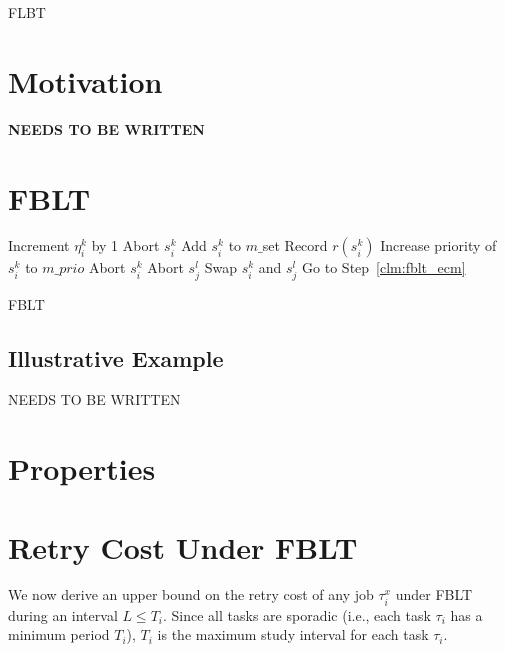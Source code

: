 \documentclass[12pt,english]{report}
\begin{document}
\thispagestyle{empty}

{\Large 
FLBT
}

\section{Motivation}
\textbf{NEEDS TO BE WRITTEN}

\section{FBLT}

\begin{algorithm}[h]
\footnotesize{
\LinesNumbered
{}
{
{
Increment $\eta_i^k$ by 1\;
Abort $s_i^k$\;
}
{
{
Add $s_i^k$ to $m\_$set\;
Record $r(s_i^k)$\;
Increase priority of $s_i^k$ to $m\_prio$\;
}
{
Abort $s_i^k$\;
}
{
Abort $s_j^l$\;
}
}
}
{
Swap $s_i^k$ and $s_j^l$\;
Go to Step~\ref{clm:fblt_ecm}
}
}
\caption{FBLT}\label{fblt-algorithm}
\end{algorithm}

\subsection{Illustrative Example}
NEEDS TO BE WRITTEN

\section{Properties}


\section{Retry Cost Under FBLT}

We now derive an upper bound on the retry cost of any job $\tau_{i}^{x}$
under FBLT during an interval $L\le T_{i}$. Since all tasks are sporadic
(i.e., each task $\tau_{i}$ has a minimum period $T_{i}$), $T_{i}$
is the maximum study interval for each task $\tau_{i}$.
\end{document}
